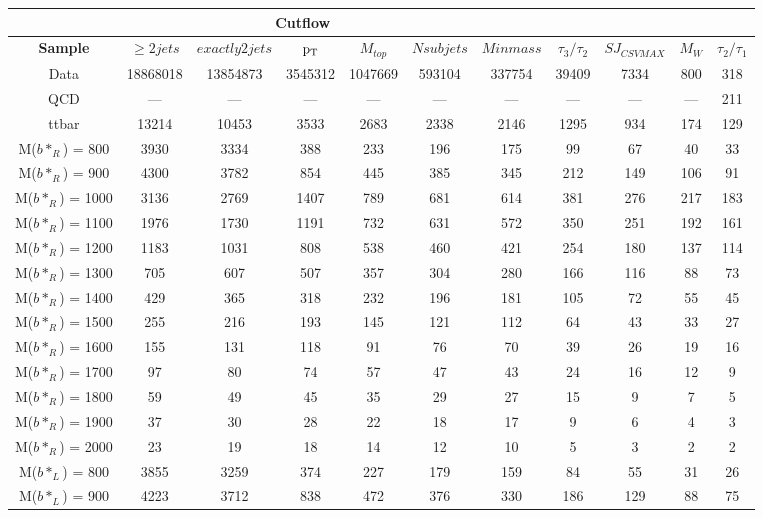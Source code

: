 \begin{table}
\begin{center}
\begin{small}
\begin{tabular}{c||c|c|c|c|c|c|c|c|c|c}
\multicolumn{8}{c}{Cutflow} \\
\hline\hline
\bf{Sample} & \bf{$\geq 2 jets$} & \bf{$exactly 2 jets$} & \bf{$\mathrm{p_{T}}$} & \bf{$M_{top}$} & \bf{$Nsubjets$} &  \bf{$Minmass$}  & $\tau_3/\tau_2$  & $SJ_{CSVMAX}$  & \bf{$M_{W}$} & $\tau_2/\tau_1$ \\ 
\hline\hline
Data & 18868018 & 13854873 & 3545312 & 1047669 & 593104 & 337754 & 39409 & 7334 & 800 & 318\\ 
QCD & --- & --- & --- & --- & --- & --- & --- & --- & --- & 211\\ 
ttbar & 13214 & 10453 & 3533 & 2683 & 2338 & 2146 & 1295 & 934 & 174 & 129\\ 
M($b*_{R}$) = 800 & 3930 & 3334 & 388 & 233 & 196 & 175 & 99 & 67 & 40 & 33\\ 
M($b*_{R}$) = 900 & 4300 & 3782 & 854 & 445 & 385 & 345 & 212 & 149 & 106 & 91\\ 
M($b*_{R}$) = 1000 & 3136 & 2769 & 1407 & 789 & 681 & 614 & 381 & 276 & 217 & 183\\ 
M($b*_{R}$) = 1100 & 1976 & 1730 & 1191 & 732 & 631 & 572 & 350 & 251 & 192 & 161\\ 
M($b*_{R}$) = 1200 & 1183 & 1031 & 808 & 538 & 460 & 421 & 254 & 180 & 137 & 114\\ 
M($b*_{R}$) = 1300 & 705 & 607 & 507 & 357 & 304 & 280 & 166 & 116 & 88 & 73\\ 
M($b*_{R}$) = 1400 & 429 & 365 & 318 & 232 & 196 & 181 & 105 & 72 & 55 & 45\\ 
M($b*_{R}$) = 1500 & 255 & 216 & 193 & 145 & 121 & 112 & 64 & 43 & 33 & 27\\ 
M($b*_{R}$) = 1600 & 155 & 131 & 118 & 91 & 76 & 70 & 39 & 26 & 19 & 16\\ 
M($b*_{R}$) = 1700 & 97 & 80 & 74 & 57 & 47 & 43 & 24 & 16 & 12 & 9\\ 
M($b*_{R}$) = 1800 & 59 & 49 & 45 & 35 & 29 & 27 & 15 & 9 & 7 & 5\\ 
M($b*_{R}$) = 1900 & 37 & 30 & 28 & 22 & 18 & 17 & 9 & 6 & 4 & 3\\ 
M($b*_{R}$) = 2000 & 23 & 19 & 18 & 14 & 12 & 10 & 5 & 3 & 2 & 2\\ 
M($b*_{L}$) = 800 & 3855 & 3259 & 374 & 227 & 179 & 159 & 84 & 55 & 31 & 26\\ 
M($b*_{L}$) = 900 & 4223 & 3712 & 838 & 472 & 376 & 330 & 186 & 129 & 88 & 75\\ 

\end{tabular}
\end{small}
\end{center}
\end{table}
